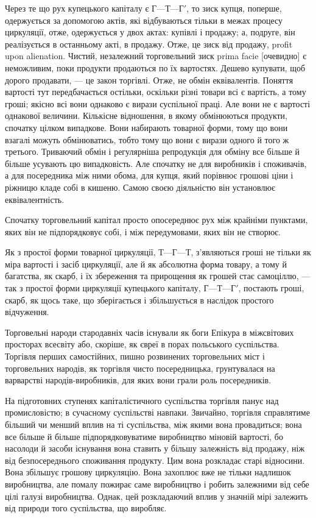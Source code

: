 Через те що рух купецького капіталу є $Г — Т — Г'$, то зиск
купця, поперше, одержується за допомогою актів, які відбуваються
тільки в межах процесу циркуляції, отже, одержується
у двох актах: купівлі і продажу; а, подруге, він реалізується в
останньому акті, в продажу. Отже, це зиск від продажу, profit
upon alienation. Чистий, незалежний торговельний зиск prima
facie [очевидно] є неможливим, поки продукти продаються по їх
вартостях. Дешево купувати, щоб дорого продавати, — це закон
торгівлі. Отже, не обмін еквівалентів. Поняття вартості тут
передбачається остільки, оскільки різні товари всі є вартість,
а тому гроші; якісно всі вони однаково є вирази суспільної праці.
Але вони не є вартості однакової величини. Кількісне відношення,
в якому обмінюються продукти, спочатку цілком випадкове. Вони
набирають товарної форми, тому що вони взагалі можуть обмінюватись,
тобто тому що вони є вирази одного й того ж третього.
Триваючий обмін і регулярніша репродукція для обміну все більше
й більше усувають цю випадковість. Але спочатку не для виробників
і споживачів, а для посередника між ними обома, для
купця, який порівнює грошові ціни і ріжницю кладе собі в кишеню.
Самою своєю діяльністю він установлює еквівалентність.

Спочатку торговельний капітал просто опосереднює рух між
крайніми пунктами, яких він не підпорядковує собі, і між передумовами,
яких він не створює.

Як з простої форми товарної циркуляції, $Т — Г — Т$, з’являються
гроші не тільки як міра вартості і засіб циркуляції, але й як
абсолютна форма товару, а тому й багатства, як скарб, і їх збереження
та прирощення як грошей стає самоціллю, — так з простої
форми циркуляції купецького капіталу, $Г — Т — Г'$, постають
гроші, скарб, як щось таке, що зберігається і збільшується в наслідок
простого відчуження.

Торговельні народи стародавніх часів існували як боги Епікура
в міжсвітових просторах всесвіту або, скоріше, як євреї в
порах польського суспільства. Торгівля перших самостійних,
пишно розвинених торговельних міст і торговельних народів, як
торгівля чисто посередницька, грунтувалася на варварстві народів-виробників,
для яких вони грали роль посередників.

На підготовних ступенях капіталістичного суспільства торгівля
панує над промисловістю; в сучасному суспільстві навпаки. Звичайно,
торгівля справлятиме більший чи менший вплив на ті суспільства,
між якими вона провадиться; вона все більше й більше
підпорядковуватиме виробництво міновій вартості, бо насолоди
й засоби існування вона ставить у більшу залежність від продажу,
ніж від безпосереднього споживання продукту. Цим вона розкладає
старі відносини. Вона збільшує грошову циркуляцію. Вона захоплює
вже не тільки надлишок виробництва, але помалу пожирає
саме виробництво і робить залежними від себе цілі галузі
виробництва. Однак, цей розкладаючий вплив у значній мірі
залежить від природи того суспільства, що виробляє.
